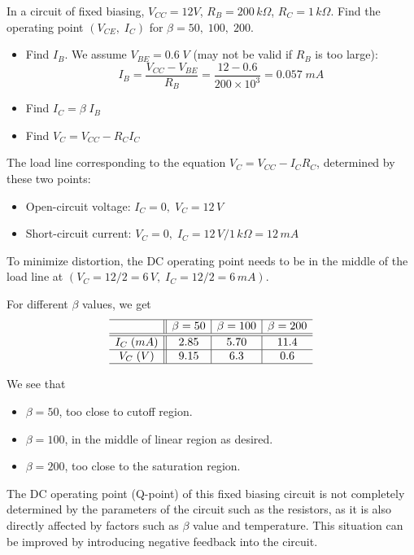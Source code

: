 \begin{itemize}
In a circuit of fixed biasing, $V_{CC}=12V$, $R_B=200\,k\Omega$, 
$R_C=1\,k\Omega$. Find the operating point $(V_{CE},\;I_C)$ for 
$\beta=50,\;100,\; 200$.

\begin{itemize}
\item Find $I_B$. We assume $V_{BE}=0.6\;V$ (may not be valid if 
  $R_B$ is too large):
  \[ 
  I_B=\frac{V_{CC}-V_{BE}}{R_B}=\frac{12-0.6}{200\times 10^3}=0.057 \;mA 
  \]

\item Find $I_C=\beta\;I_B$ 
\item Find $V_C=V_{CC}-R_C I_C$
\end{itemize}

The load line corresponding to the equation 
$V_C=V_{CC}-I_C R_C$, determined by these two points:
\begin{itemize}
\item Open-circuit voltage: $I_C=0,\; V_C=12\,V$
\item Short-circuit current: $V_C=0,\; I_C=12\,V/1\,k\Omega=12\,mA$
\end{itemize}

To minimize distortion, the DC operating point needs to be in the 
middle of the load line at $(V_C=12/2=6\,V,\;I_C=12/2=6\,mA)$. 

For different $\beta$ values, we get
\[
\begin{array}{c||c|c|c}\hline
          & \beta=50 & \beta=100 & \beta=200 \\\hline\hline
I_C\;(mA) &  2.85    &  5.70     &  11.4 \\\hline
V_C\;(V)  & 9.15     &  6.3      &  0.6 \\\hline
\end{array}
\]

We see that
\begin{itemize}
\item $\beta=50$, too close to cutoff region.
\item $\beta=100$, in the middle of linear region as desired.
\item $\beta=200$, too close to the saturation region.
\end{itemize}

The DC operating point (Q-point) of this fixed biasing circuit is
not completely determined by the parameters of the circuit such 
as the resistors, as it is also directly affected by factors such 
as $\beta$ value and temperature. This situation can be improved by 
introducing negative feedback into the circuit.



\end{itemize}

